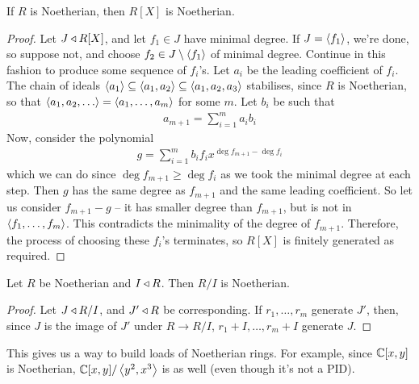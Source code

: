\documentclass{../../template/note}
\begin{document}
    \begin{theorem}
        If $R$ is Noetherian, then $R[X]$ is Noetherian.
    \end{theorem}
    
    \begin{proof}
        Let $J \triangleleft R[X]$, and let $f_1 \in J$ have minimal degree. If $J = \left \langle f_1 \right \rangle$, we're done, so suppose not, and choose $f_2 \in J \setminus \left \langle f_1 \right \rangle$ of minimal degree. Continue in this fashion to produce some sequence of $f_i$'s. Let $a_i$ be the leading coefficient of $f_i$. The chain of ideals $\left \langle a_1 \right \rangle \subseteq \left \langle a_1, a_2 \right \rangle \subseteq \left \langle a_1, a_2, a_3 \right \rangle$ stabilises, since $R$ is Noetherian, so that $\gen{a_1, a_2, \dots} = \gen{a_1, \dots, a_m}$ for some $m$. Let $b_i$ be such that
        \begin{align*}
            a_{m+1} = \sum_{i=1}^m a_ib_i
        \end{align*}
        Now, consider the polynomial
        \begin{align*}
            g = \sum_{i=1}^m b_if_i x^{\deg{f_{m+1}}-\deg{f_i}}
        \end{align*}
        which we can do since $\deg{f_{m+1}} \geq \deg{f_i}$ as we took the minimal degree at each step. Then $g$ has the same degree as $f_{m+1}$ and the same leading coefficient. So let us consider $f_{m+1}-g$ -- it has smaller degree than $f_{m+1}$, but is not in $\left \langle f_1, \dots, f_m \right \rangle$. This contradicts the minimality of the degree of $f_{m+1}$. Therefore, the process of choosing these $f_i$'s terminates, so $R[X]$ is finitely generated as required.
    \end{proof}
    
    \begin{proposition}
        Let $R$ be Noetherian and $I \triangleleft R$. Then $R/I$ is Noetherian.
    \end{proposition}
    
    \begin{proof}
        Let $J \triangleleft R/I$, and $J' \triangleleft R$ be corresponding. If $r_1, \dots, r_m$ generate $J'$, then, since $J$ is the image of $J'$ under $R \to R/I$, $r_1+I, \dots, r_m+I$ generate $J$.
    \end{proof}

    \begin{example*}
        This gives us a way to build loads of Noetherian rings. For example, since $\mathbb C[x, y]$ is Noetherian, $\mathbb C[x, y]/\left \langle y^2, x^3 \right \rangle$ is as well (even though it's not a PID).
    \end{example*}
    
\end{document}

